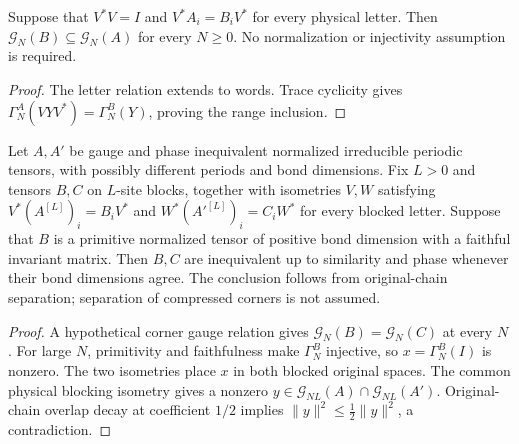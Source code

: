 \begin{lemma}
    \label{thm:isometric_cointertwiner_ground_space_inclusion}
    \leanok
    Suppose that $V^*V=I$ and $V^*A_i=B_iV^*$ for every physical letter.
    Then $\mathcal G_N(B)\subseteq\mathcal G_N(A)$ for every $N\geq0$.
    No normalization or injectivity assumption is required.
\end{lemma}
\begin{proof}\leanok
    The letter relation extends to words. Trace cyclicity gives
    $\Gamma^A_N(VYV^*)=\Gamma^B_N(Y)$, proving the range inclusion.
\end{proof}

\begin{lemma}
    \label{thm:distinct_periodic_corner_separation}
    \leanok
    Let $A,A'$ be gauge and phase inequivalent normalized irreducible
    periodic tensors, with possibly different periods and bond dimensions.
    Fix $L>0$ and tensors $B,C$ on $L$-site blocks, together with isometries
    $V,W$ satisfying
    $V^*(A^{[L]})_i=B_iV^*$ and
    $W^*(A'^{[L]})_i=C_iW^*$ for every blocked letter.
    Suppose that $B$ is a primitive normalized tensor of positive bond
    dimension with a faithful invariant matrix. Then $B,C$ are inequivalent
    up to similarity and phase whenever their bond dimensions agree.
    The conclusion follows from original-chain separation; separation of
    compressed corners is not assumed.
\end{lemma}
\begin{proof}\leanok
    A hypothetical corner gauge relation gives
    $\mathcal G_N(B)=\mathcal G_N(C)$ at every $N$.
    For large $N$, primitivity and faithfulness make $\Gamma^B_N$ injective,
    so $x=\Gamma^B_N(I)$ is nonzero. The two isometries place $x$ in both
    blocked original spaces. The common physical blocking isometry gives a
    nonzero $y\in\mathcal G_{NL}(A)\cap\mathcal G_{NL}(A')$.
    Original-chain overlap decay at coefficient $1/2$ implies
    $\|y\|^2\leq\tfrac12\|y\|^2$, a contradiction.
\end{proof}

